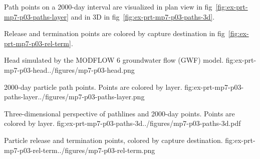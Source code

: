 Path points on a 2000-day interval are visualized in plan view in fig~\ref{fig:ex-prt-mp7-p03-paths-layer} and in 3D in fig~\ref{fig:ex-prt-mp7-p03-paths-3d}.

Release and termination points are colored by capture destination in fig~\ref{fig:ex-prt-mp7-p03-rel-term}.

\begin{StandardFigure}{
    Head simulated by the MODFLOW 6 groundwater flow (GWF) model.
    }{fig:ex-prt-mp7-p03-head}{../figures/mp7-p03-head.png}
\end{StandardFigure}

\begin{StandardFigure}{
    2000-day particle path points. Points are colored by layer.
    }{fig:ex-prt-mp7-p03-paths-layer}{../figures/mp7-p03-paths-layer.png}
\end{StandardFigure}

\begin{StandardFigure}{
    Three-dimensional perspective of pathlines and 2000-day points. Points are colored by layer.
    }{fig:ex-prt-mp7-p03-paths-3d}{../figures/mp7-p03-paths-3d.pdf}
\end{StandardFigure}

\begin{StandardFigure}{
    Particle release and termination points, colored by capture destination.
    }{fig:ex-prt-mp7-p03-rel-term}{../figures/mp7-p03-rel-term.png}
\end{StandardFigure}
